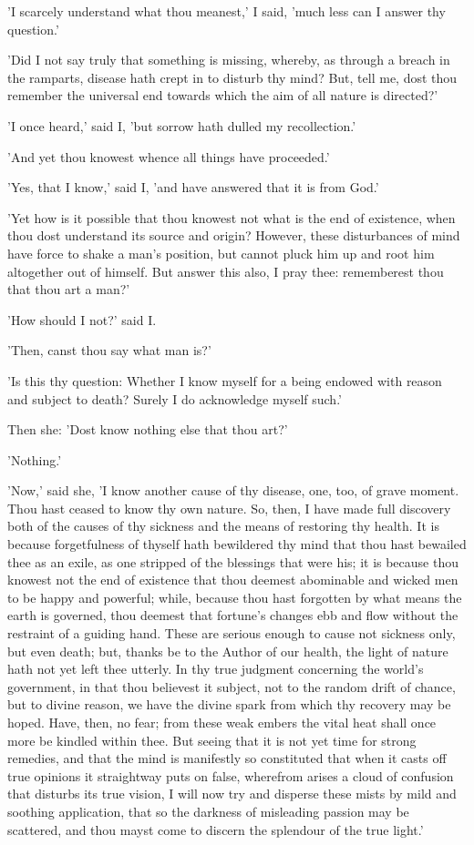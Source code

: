 'I scarcely understand what thou meanest,' I said, 'much less can I
answer thy question.'

'Did I not say truly that something is missing, whereby, as through a
breach in the ramparts, disease hath crept in to disturb thy mind? But,
tell me, dost thou remember the universal end towards which the aim of
all nature is directed?'

'I once heard,' said I, 'but sorrow hath dulled my recollection.'

'And yet thou knowest whence all things have proceeded.'

'Yes, that I know,' said I, 'and have answered that it is from God.'

'Yet how is it possible that thou knowest not what is the end of
existence, when thou dost understand its source and origin? However,
these disturbances of mind have force to shake a man's position, but
cannot pluck him up and root him altogether out of himself. But answer
this also, I pray thee: rememberest thou that thou art a man?'

'How should I not?' said I.

'Then, canst thou say what man is?'

'Is this thy question: Whether I know myself for a being endowed with
reason and subject to death? Surely I do acknowledge myself such.'

Then she: 'Dost know nothing else that thou art?'

'Nothing.'

'Now,' said she, 'I know another cause of thy disease, one, too, of
grave moment. Thou hast ceased to know thy own nature. So, then, I have
made full discovery both of the causes of thy sickness and the means of
restoring thy health. It is because forgetfulness of thyself hath
bewildered thy mind that thou hast bewailed thee as an exile, as one
stripped of the blessings that were his; it is because thou knowest not
the end of existence that thou deemest abominable and wicked men to be
happy and powerful; while, because thou hast forgotten by what means the
earth is governed, thou deemest that fortune's changes ebb and flow
without the restraint of a guiding hand. These are serious enough to
cause not sickness only, but even death; but, thanks be to the Author of
our health, the light of nature hath not yet left thee utterly. In thy
true judgment concerning the world's government, in that thou believest
it subject, not to the random drift of chance, but to divine reason, we
have the divine spark from which thy recovery may be hoped. Have, then,
no fear; from these weak embers the vital heat shall once more be
kindled within thee. But seeing that it is not yet time for strong
remedies, and that the mind is manifestly so constituted that when it
casts off true opinions it straightway puts on false, wherefrom arises a
cloud of confusion that disturbs its true vision, I will now try and
disperse these mists by mild and soothing application, that so the
darkness of misleading passion may be scattered, and thou mayst come to
discern the splendour of the true light.'


